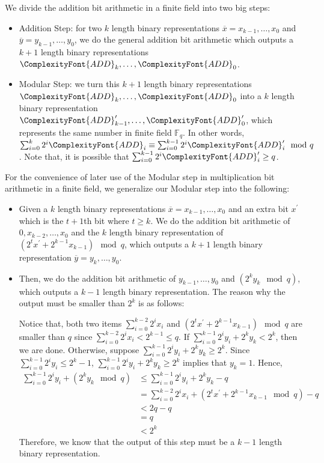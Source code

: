 \documentclass[11pt,letter]{article}
\theoremstyle{remark} %
\newcommand{\add}{ %
    {
        \ComplexityFont{ADD}
    }
}
\begin{document}
{    We divide the addition bit arithmetic in a finite field into two big steps:
    \begin{itemize}
        \item Addition Step: for two $k$ length binary representations $\overline{x}=x_{k-1},\dots,x_0$ and $\overline{y}=y_{k-1},\dots,y_0$, we do the general addition bit arithmetic which outputs a $k+1$ length binary representations $\add_k,\dots, \add_0$.
        \item Modular Step: we turn this $k+1$ length binary representations $\add_k,\dots, \add_0$ into a $k$ length binary representation $\add_{k-1}^\prime ,\dots,\add_0^\prime$, which represents the same number in finite field $\mathbb{F}_q$. In other words, $\sum_{i=0}^k 2^i \add_i \equiv \sum_{i=0}^{k-1} 2^i \add_i^\prime \mod{q}$. Note that, it is possible that $\sum_{i=0}^{k-1} 2^i \add_i^\prime \geq q$. 
    \end{itemize}
    For the convenience of later use of the Modular step in multiplication bit arithmetic in a finite field, we generalize our Modular step into the following:
    \begin{itemize}
        \item Given a $k$ length binary representations $\overline{x} = x_{k-1}, \dots, x_0$ and an extra bit $x^\prime$ which is the $t+1$th bit where $t \geq k$. We do the addition bit arithmetic of $0,x_{k-2} ,\dots, x_0$ and the $k$ length binary representation of $(2^t x^\prime +2^{k-1} x_{k-1}) \mod{q}$, which outputs a $k+1$ length binary representation $\overline{y} = y_k, \dots, y_0$.
        \item Then, we do the addition bit arithmetic of $y_{k-1}, \dots, y_0$ and $(2^k y_k \mod{q})$, which outputs a $k-1$ length binary representation. The reason why the output must be smaller than $2^k$ is as follows: 
    
        Notice that, both two items $\sum_{i=0}^{k-2} 2^i x_i $ and $(2^t x^\prime +2^{k-1} x_{k-1}) \mod{q}$ are smaller than $q$ since $\sum_{i=0}^{k-2} 2^i x_i < 2^{k-1} \leq q$. If $\sum_{i=0}^{k-1} 2^i y_i + 2^k y_k < 2^k $, then we are done. Otherwise, suppose $\sum_{i=0}^{k-1} 2^i y_i + 2^k y_k \geq 2^k $. Since $\sum_{i=0}^{k-1} 2^i y_i \leq 2^k -1$, $\sum_{i=0}^{k-1} 2^i y_i + 2^k y_k \geq 2^k $ implies that $y_k =1$. Hence,
        \begin{align*}
            \sum_{i=0}^{k-1} 2^i y_i + (2^k y_k \mod{q})  &\leq \sum_{i=0}^{k-1} 2^i y_i + 2^k y_k -q\\
            & = \sum_{i=0}^{k-2} 2^i x_i+ (2^t x^\prime +2^{k-1} x_{k-1} \mod{q}) -q\\
            & < 2q- q \\
            & = q\\
            & < 2^k
        \end{align*}
        Therefore, we know that the output of this step must be a  $k-1$ length binary representation.
    \end{itemize}

}
\end{document}
